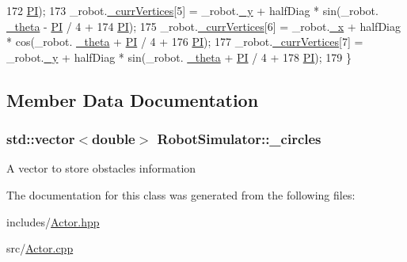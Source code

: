 \begin{DoxyCode}
172                             \hyperlink{Actor_8hpp_a598a3330b3c21701223ee0ca14316eca}{PI});
173   \_robot.\hyperlink{structRobotSimulator_1_1Robot_acc4b3b442e3739589a5b7a3597988df2}{\_currVertices}[5] = \_robot.\hyperlink{structRobotSimulator_1_1Robot_a0b386e0cb1fcdbb0ed0fd0a42d362165}{\_y} + halfDiag * sin(\_robot.
      \hyperlink{structRobotSimulator_1_1Robot_a9c91ff0ff4514da0c9cd56f45064032e}{\_theta} - \hyperlink{Actor_8hpp_a598a3330b3c21701223ee0ca14316eca}{PI} / 4 +
174                             \hyperlink{Actor_8hpp_a598a3330b3c21701223ee0ca14316eca}{PI});
175   \_robot.\hyperlink{structRobotSimulator_1_1Robot_acc4b3b442e3739589a5b7a3597988df2}{\_currVertices}[6] = \_robot.\hyperlink{structRobotSimulator_1_1Robot_ab86590932e31a8a7aad72e0173b8c0e8}{\_x} + halfDiag * cos(\_robot.
      \hyperlink{structRobotSimulator_1_1Robot_a9c91ff0ff4514da0c9cd56f45064032e}{\_theta} + \hyperlink{Actor_8hpp_a598a3330b3c21701223ee0ca14316eca}{PI} / 4 +
176                             \hyperlink{Actor_8hpp_a598a3330b3c21701223ee0ca14316eca}{PI});
177   \_robot.\hyperlink{structRobotSimulator_1_1Robot_acc4b3b442e3739589a5b7a3597988df2}{\_currVertices}[7] = \_robot.\hyperlink{structRobotSimulator_1_1Robot_a0b386e0cb1fcdbb0ed0fd0a42d362165}{\_y} + halfDiag * sin(\_robot.
      \hyperlink{structRobotSimulator_1_1Robot_a9c91ff0ff4514da0c9cd56f45064032e}{\_theta} + \hyperlink{Actor_8hpp_a598a3330b3c21701223ee0ca14316eca}{PI} / 4 +
178                             \hyperlink{Actor_8hpp_a598a3330b3c21701223ee0ca14316eca}{PI});
179 \}\end{DoxyCode}


\subsection{Member Data Documentation}
\hypertarget{classRobotSimulator_a3ce83e536763d1892fb099ba110be183}{
\subsubsection[{\-\_\-circles}]{\setlength{\rightskip}{0pt plus 5cm}std\-::vector$<$double$>$ Robot\-Simulator\-::\-\_\-circles}}\label{classRobotSimulator_a3ce83e536763d1892fb099ba110be183}
A vector to store obstacles information 

The documentation for this class was generated from the following files\-:\begin{DoxyCompactItemize}
\item 
includes/\hyperlink{Actor_8hpp}{Actor.\-hpp}\item 
src/\hyperlink{Actor_8cpp}{Actor.\-cpp}\end{DoxyCompactItemize}

